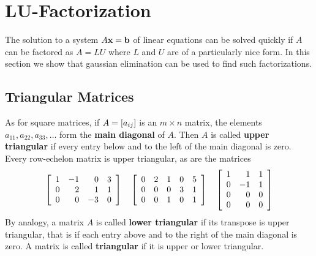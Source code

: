 \section[LU-Factorization]{LU-Factorization\footnotemark}
\label{sec:2_7}


The solution to a system $A\textbf{x} = \textbf{b}$ of linear equations can be solved quickly if $A$ can be factored as $A = LU$ where $L$ and $U$ are of a particularly nice form. In this section we show that gaussian elimination can be used to find such factorizations.

\subsection*{Triangular Matrices}

As for square matrices, if $A = \left[ a_{ij} \right]$ is an $m \times n$ matrix, the elements $a_{11}, a_{22}, a_{33}, \dots$ form the \textbf{main diagonal} of $A$. Then $A$ is called \textbf{upper triangular} if every entry below and to the left of the main diagonal is zero. Every row-echelon matrix is upper triangular, as are the matrices
\begin{equation*}
\left[ \begin{array}{rrrr}
1 & -1 & 0 & 3 \\
0 & 2 & 1 & 1 \\
0 & 0 & -3 & 0
\end{array} \right] \quad \left[ \begin{array}{rrrrr}
0 & 2 & 1 & 0 & 5 \\
0 & 0 & 0 & 3 & 1 \\
0 & 0 & 1 & 0 & 1
\end{array} \right] \quad \left[ \begin{array}{rrr}
1 & 1 & 1 \\
0 & -1 & 1 \\
0 & 0 & 0 \\
0 & 0 & 0 \\
\end{array} \right]
\end{equation*}
By analogy, a matrix $A$ is called \textbf{lower triangular} if its transpose is upper triangular, that is if each entry above and to the right of the main diagonal is zero. A matrix is called \textbf{triangular} if it is upper or lower triangular.

